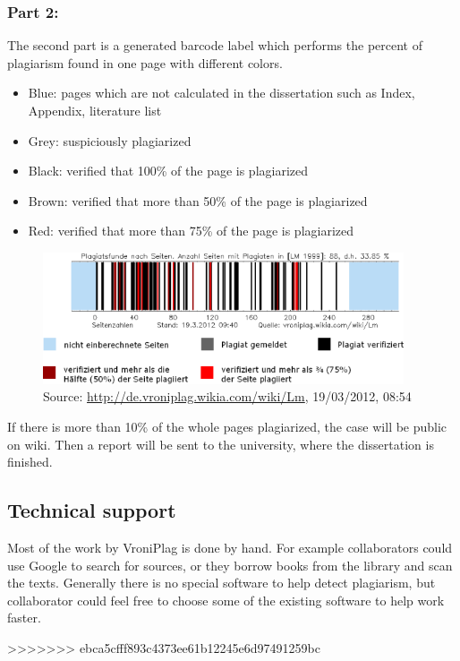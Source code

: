 \subsubsection{Part 2:} 

The second part is a generated barcode label which performs the percent of plagiarism found in one page with 
different colors.

\begin{itemize}
\item Blue: pages which are not calculated in the dissertation such as Index, Appendix, literature list
\item Grey: suspiciously plagiarized
\item Black: verified that 100\% of the page is plagiarized
\item Brown: verified that more than 50\% of the page is plagiarized
\item Red: verified that more than 75\% of the page is plagiarized
\end{itemize}

\begin{figure}[!h]
  \centering
    \includegraphics[width=0.95\textwidth]{images/vroni-barcode.png}
  \caption{Source: \url{http://de.vroniplag.wikia.com/wiki/Lm}, 19/03/2012, 08:54}
  \label{fig:vroniBarcode}
\end{figure}



If there is more than 10\% of the whole pages plagiarized, the case will be public on wiki. Then a report will be sent 
to the university, where the dissertation is finished.

\subsection{Technical support}

Most of the work by VroniPlag is done by hand. For example collaborators could use Google to search for sources, 
or they borrow books from the library and scan the texts. Generally there is no special software to help detect 
plagiarism, but collaborator could feel free to choose some of the existing software to help work faster.

>>>>>>> ebca5cfff893c4373ee61b12245e6d97491259bc
